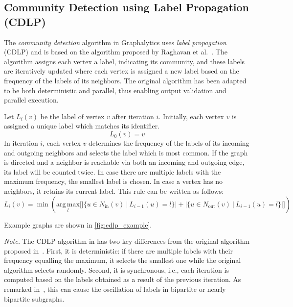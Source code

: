 \subsection{Community Detection using Label Propagation (CDLP)}
\label{sec:cdlp}
The \emph{community detection} algorithm in Graphalytics uses \emph{label propagation} (CDLP) and is based on the algorithm proposed by Raghavan et al.~\cite{raghavan2007near}. The algorithm assigns each vertex a label, indicating its community, and these labels are iteratively updated where each vertex is assigned a new label based on the frequency of the labels of its neighbors. The original algorithm has been adapted to be both deterministic and parallel, thus enabling output validation and parallel execution.

Let $L_i(v)$ be the label of vertex $v$ after iteration $i$. Initially, each vertex $v$ is assigned a unique label which matches its identifier.
%
\begin{equation}
L_0(v) = v
\end{equation}
%
In iteration $i$, each vertex $v$ determines the frequency of the labels of its incoming and outgoing neighbors and selects the label which is most common.  If the graph is directed and a neighbor is reachable via both an incoming and outgoing edge, its label will be counted twice. In case there are multiple labels with the maximum frequency, the smallest label is chosen. In case a vertex has no neighbors, it retains its current label. This rule can be written as follows:
%
\begin{equation}
L_i(v) = \min \left( \underset{l}{\mathrm{arg\,max}} \Bigg[ \Big|\{ u \in N_\mathrm{in}(v)~|~L_{i-1}(u) = l \}\Big| + \Big|\{ u \in N_\mathrm{out}(v)~|~L_{i-1}(u) = l \}\Big| \Bigg] \right)
\end{equation}

Example graphs are shown in \autoref{fig:cdlp_example}.

\emph{Note.} The CDLP algorithm in \toolname{} has two key differences from the original algorithm proposed in~\cite{raghavan2007near}.
First, it is deterministic: if there are multiple labels with their frequency equalling the maximum, it selects the smallest one while the original algorithm selects randomly.
Second, it is synchronous, i.e., each iteration is computed based on the labels obtained as a result of the previous iteration.
As remarked in~\cite{raghavan2007near}, this can cause the oscillation of labels in bipartite or nearly bipartite subgraphs.

